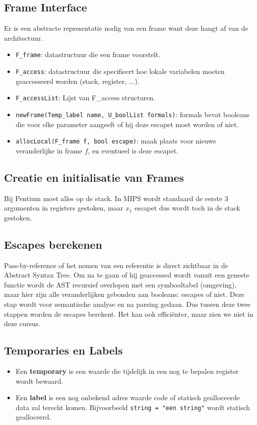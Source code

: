 \subsection{Frame Interface}
Er is een abstracte representatie nodig van een frame want deze hangt af van de architectuur.

\begin{itemize}
	\item \texttt{F\_frame}: datastructuur die een frame voorstelt. 
	\item \texttt{F\_access}: datastructuur die specifieert hoe lokale variabelen moeten geaccesseerd worden (stack, register, ...).
	\item \texttt{F\_accessList}: Lijst van F\_access structuren.
	\item \texttt{newFrame(Temp\_label name, U\_boolList formals)}: formals bevat booleans die voor elke parameter aangeeft of hij deze escapet moet worden of niet.
	\item \texttt{allocLocal(F\_frame f, bool escape)}: maak plaats voor nieuwe veranderlijke in frame $f$, en eventueel is deze escapet.
\end{itemize}
 
\subsection{Creatie en initialisatie van Frames}

Bij Pentium moet alles op de stack. In MIPS wordt standaard de eerste 3 argumenten in registers gestoken, maar $x_1$ escapet dus wordt toch in de stack gestoken. 
 
 \subsection{Escapes berekenen}
 Pass-by-reference of het nemen van een referentie is direct zichtbaar in de Abstract Syntax Tree. Om na te gaan of hij geaccessed wordt vanuit een geneste functie wordt de AST recursief overlopen met een symbooltabel (omgeving), maar hier zijn alle veranderlijken gebonden aan booleans: escapes of niet. Deze stap wordt voor semantische analyse en na parsing gedaan. Dus tussen deze twee stappen worden de escapes berekent. Het kan ook efficiënter, maar zien we niet in deze cursus.
 
\subsection{Temporaries en Labels}
\begin{itemize}
	\item Een \textbf{temporary} is een waarde die tijdelijk in een nog te bepalen register wordt bewaard.
	\item Een \textbf{label} is een nog onbekend adres waarde code of statisch gealloceerde data zal terecht komen. Bijvoorbeeld \texttt{string = "een string"} wordt statisch gealloceerd.
\end{itemize} 
